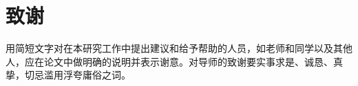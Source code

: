 \chapter*{致谢}

用简短文字对在本研究工作中提出建议和给予帮助的人员，如老师和同学以及其他人，应在论文中做明确的说明并表示谢意。对导师的致谢要实事求是、诚恳、真挚，切忌滥用浮夸庸俗之词。
